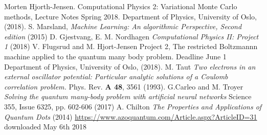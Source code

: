 \documentclass[norsk,a4paper,12pt]{article}
\begin{document}
\begingroup
\renewcommand{\section}[2]{}
\begin{thebibliography}{}
	Morten Hjorth-Jensen.
	Computational Physics 2: Variational Monte Carlo methods, Lecture Notes Spring 2018.
	Department of Physics, University of Oslo,
	(2018).
	S. Marsland, \emph{Machine Learning: An algorithmic Perspective, Second edition} (2015)
	 D. Gjestvang, E. M. Nordhagen \emph{Computational Physics II: Project 1} (2018)
	 V. Flugsrud and M. Hjort-Jensen
	 Project 2, The restricted Boltzmannn machine applied to the quantum many body problem. Deadline June 1
	 Department of Physics, University of Oslo,
	 (2018).
	 M. Taut \emph{Two electrons in an external oscillator potential: Particular analytic solutions of a Coulomb correlation problem.} Phys. Rev. \textbf{A 48}, 3561 (1993).
	 G.Carleo and M. Troyer  \emph{Solving the quantum many-body problem with artificial neural networks} Science 355, Issue 6325, pp. 602-606 (2017)
	 A. Chilton \emph{The Properties and Applications of Quantum Dots} (2014) \url{https://www.azoquantum.com/Article.aspx?ArticleID=31} downloaded May 6th 2018

	
	
\end{thebibliography}
\endgroup
\end{document}
